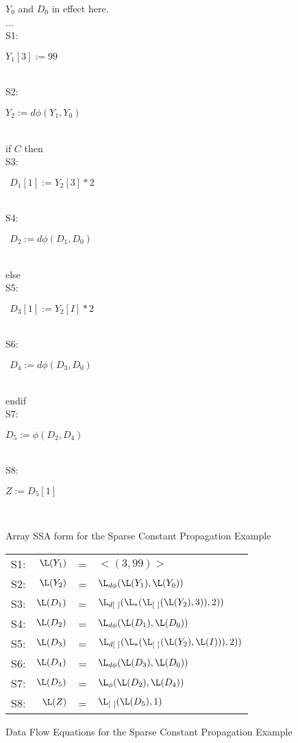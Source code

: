 \begin{figure}%
\begin{center}
\parbox{3.0in}{
\begin{programa}
\Tb $Y_0$ and $D_0$ in effect here. \\
\Tb  ... \\
\mbox{S1:}\Tb \parbox{1.5in} {$Y_1[3] := 99$}  \\
\mbox{S2:}\Tb \parbox{1.5in} {$Y_2 := d\phi(Y_1,Y_0)$}  \\
\Tb  if $C$ then \\
\mbox{S3:}\Tb \parbox{1.5in} {$\ \ D_1[1] := Y_2[3] * 2$}  \\
\mbox{S4:}\Tb \parbox{1.5in} {$\ \ D_2 := d\phi(D_1,D_0)$}  \\
\Tb else \\
\mbox{S5:}\Tb \parbox{1.5in} {$\ \ D_3[1] := Y_2[I] * 2$}  \\
\mbox{S6:}\Tb \parbox{1.5in} {$\ \ D_4 := d\phi(D_3,D_0)$}  \\
\Tb endif \\
\mbox{S7:}\Tb \parbox{1.5in} {$D_5 := \phi(D_2,D_4)$}  \\
\mbox{S8:}\Tb \parbox{1.5in} {$Z := D_5[1]$}  \\
\end{programa}
}
\end{center}
\caption{Array SSA form for the Sparse Constant Propagation Example}
\label{fig:sc-ex-ssa}
\end{figure}

\begin{figure}%
\begin{center}
\begin{tabular}{r r c l}
\mbox{S1:} & $\L(Y_1)$ & = & $<(3,99)>$ \\
\mbox{S2:} & $\L(Y_2)$ & = & $\L_{d\phi} (\L(Y_1), \L(Y_0))$ \\
\mbox{S3:} & $\L(D_1)$ & = & $\L_{d[\ ]}(\L_*(\L_{[\ ]}(\L(Y_2),3)), 2))$ \\
\mbox{S4:} & $\L(D_2)$ & = & $\L_{d\phi} (\L(D_1), \L(D_0))$ \\
\mbox{S5:} & $\L(D_3)$ & = & $\L_{d[\ ]}(\L_*(
\L_{[\ ]}(\L(Y_2),\L(I)))
, 2))$ \\
\mbox{S6:} & $\L(D_4)$ & = & $\L_{d\phi} (\L(D_3), \L(D_0))$ \\
\mbox{S7:} & $\L(D_5)$ & = & $\L_{\phi}(\L(D_2),\L(D_4))$ \\
\mbox{S8:} & $\L(Z)$ & =  & $\L_{[\ ]}(\L(D_5), 1)$
\end{tabular}
\end{center}
\caption{Data Flow Equations for the Sparse Constant Propagation Example}
\label{fig:sc-ex-df}
\end{figure}



